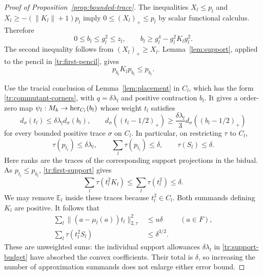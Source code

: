 \begin{proof}[Proof of Proposition~\ref{prop:bounded-trace}]
The inequalities $X_l\leq p_l$ and $X_l\geq-(\|K_l\|+1)p_l$
imply $0\leq(X_l)_+\leq p_l$ by scalar functional calculus.  Therefore
\begin{equation}\label{tr:first-pencil-bounds}
 0\leq b_l\leq g_l^2\leq z_l,\qquad
 b_l\geq g_l^4-g_l^2K_lg_l^2.
\end{equation}
The second inequality follows from $(X_l)_+\geq X_l$.
Lemma~\ref{lem:support}, applied to the pencil in
\eqref{tr:first-pencil}, gives
\begin{equation}\label{tr:first-support}
 p_{b_l}K_lp_{b_l}\leq p_{b_l}.
\end{equation}

Use the tracial conclusion of Lemma~\ref{lem:placement} in $C_l$,
which has the form \eqref{tr:commutant-corners}, with
$q=\delta\lambda_l$ and positive contraction $b_l$.
It gives a \cpc order-zero map
$\psi_l:M_k\to\operatorname{her}_{C_l}(b_l)$ whose weight $t_l$ satisfies
\begin{equation}\label{tr:placement}
 d_\sigma(t_l)\leq\delta\lambda_l d_\sigma(b_l),\qquad
 d_\sigma((t_l-1/2)_+)
 \geq\frac{\delta\lambda_l}{3}d_\sigma((b_l-1/2)_+)
\end{equation}
for every bounded positive trace $\sigma$ on $C_l$.
In particular, on restricting $\tau$ to $C_l$,
\begin{equation}\label{tr:support-budget}
 \tau(p_{t_l})\leq\delta\lambda_l,\qquad
 \sum_l\tau(p_{t_l})\leq\delta,\qquad \tau(S_l)\leq\delta.
\end{equation}
Here ranks are the traces of the corresponding support projections in
the bidual.  As $p_{t_l}\leq p_{b_l}$, \eqref{tr:first-support} gives
\[
 \sum_l\tau(t_l^2K_l)\leq\sum_l\tau(t_l^2)\leq\delta.
\]
We may remove $\mathbb E_l$ inside these traces because $t_l^2\in C_l$.
Both summands defining $K_l$ are positive.  It follows that
\begin{align}
 \sum_l\|(a-\mu_l(a))t_l\|_{2,\tau}^2
 &\leq u\delta &&(a\in F),\label{tr:T2-model}\\
 \sum_l\tau(t_l^2S_l)&\leq\delta^{3/2}.
 \label{tr:T2-overlap}
\end{align}
These are unweighted sums: the individual support allowances
$\delta\lambda_l$ in \eqref{tr:support-budget} have absorbed the
convex coefficients. Their total is $\delta$, so increasing the number
of approximation summands does not enlarge either error bound.


\end{proof}
